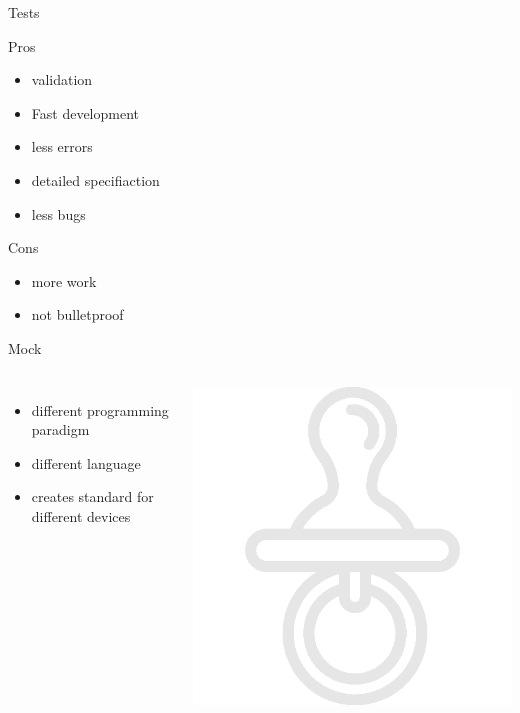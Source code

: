 \documentclass{beamer}
\begin{document}
	\begin{frame}{Tests}

		Pros
		\begin{itemize}
			\item validation
			\item Fast development
			\item less errors
			\item detailed specifiaction
			\item less bugs
		\end{itemize}

		Cons
		\begin{itemize}
			\item more work
			\item not bulletproof
		\end{itemize}

	\end{frame}
	

	\begin{frame}{Mock}

		\begin{columns}[onlytextwidth,T]
		\column{\dimexpr\linewidth-30mm-5mm}
			\begin{itemize}
				\item different programming paradigm
				\item different language
				\item creates standard for different devices	
			\end{itemize}

	      \column{30mm}
	      \includegraphics[width=0.2\paperwidth]{Dummy.png}

	    \end{columns}

	\end{frame}
\end{document}
